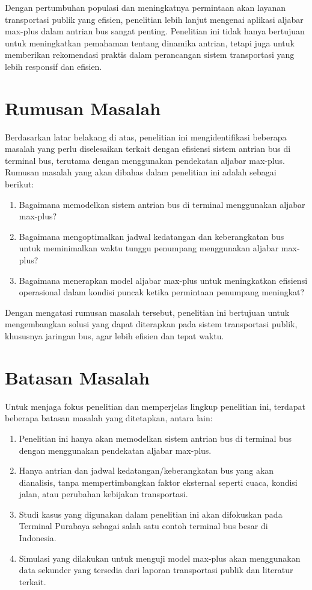 \documentclass{file/TA-ITS}
\theoremstyle{definition}
\theoremstyle{definition}
\theoremstyle{plain}
\begin{document}
Dengan pertumbuhan populasi dan meningkatnya permintaan akan layanan transportasi publik yang efisien, penelitian lebih lanjut mengenai aplikasi aljabar max-plus dalam antrian bus sangat penting. Penelitian ini tidak hanya bertujuan untuk meningkatkan pemahaman tentang dinamika antrian, tetapi juga untuk memberikan rekomendasi praktis dalam perancangan sistem transportasi yang lebih responsif dan efisien.


\section{Rumusan Masalah}
Berdasarkan latar belakang di atas, penelitian ini mengidentifikasi beberapa masalah yang perlu diselesaikan terkait dengan efisiensi sistem antrian bus di terminal bus, terutama dengan menggunakan pendekatan aljabar max-plus. Rumusan masalah yang akan dibahas dalam penelitian ini adalah sebagai berikut:

\begin{enumerate}
    \item Bagaimana memodelkan sistem antrian bus di terminal menggunakan aljabar max-plus?
    \item Bagaimana mengoptimalkan jadwal kedatangan dan keberangkatan bus untuk meminimalkan waktu tunggu penumpang menggunakan aljabar max-plus?
    \item Bagaimana menerapkan model aljabar max-plus untuk meningkatkan efisiensi operasional dalam kondisi puncak ketika permintaan penumpang meningkat?
\end{enumerate}

Dengan mengatasi rumusan masalah tersebut, penelitian ini bertujuan untuk mengembangkan solusi yang dapat diterapkan pada sistem transportasi publik, khususnya jaringan bus, agar lebih efisien dan tepat waktu.

\section{Batasan Masalah}
Untuk menjaga fokus penelitian dan memperjelas lingkup penelitian ini, terdapat beberapa batasan masalah yang ditetapkan, antara lain:

\begin{enumerate}
    \item Penelitian ini hanya akan memodelkan sistem antrian bus di terminal bus dengan menggunakan pendekatan aljabar max-plus.
    \item Hanya antrian dan jadwal kedatangan/keberangkatan bus yang akan dianalisis, tanpa mempertimbangkan faktor eksternal seperti cuaca, kondisi jalan, atau perubahan kebijakan transportasi.
    \item Studi kasus yang digunakan dalam penelitian ini akan difokuskan pada Terminal Purabaya sebagai salah satu contoh terminal bus besar di Indonesia.
    \item Simulasi yang dilakukan untuk menguji model max-plus akan menggunakan data sekunder yang tersedia dari laporan transportasi publik dan literatur terkait.
\end{enumerate}
\end{document}
